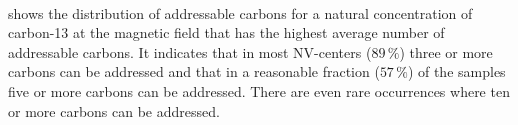 





\paragraph{ }
 shows the distribution of addressable carbons for a natural concentration of carbon-13 at the magnetic field that has the highest average number of addressable carbons.
It indicates that in most NV-centers ($89\,\%$) three or more carbons can be addressed and that in a reasonable fraction ($57\,\%$) of the samples five or more carbons can be addressed.
There are even rare occurrences where ten or more carbons can be addressed.



